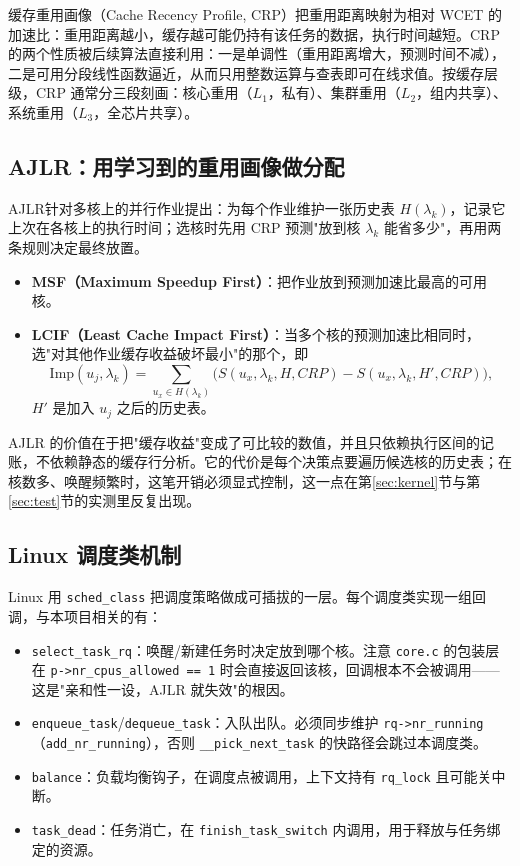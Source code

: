 缓存重用画像（Cache Recency Profile, CRP）把重用距离映射为相对 WCET 的加速比：重用距离越小，缓存越可能仍持有该任务的数据，执行时间越短。CRP 的两个性质被后续算法直接利用：一是单调性（重用距离增大，预测时间不减），二是可用分段线性函数逼近，从而只用整数运算与查表即可在线求值。按缓存层级，CRP 通常分三段刻画：核心重用（$L_1$，私有）、集群重用（$L_2$，组内共享）、系统重用（$L_3$，全芯片共享）。

\subsection{AJLR：用学习到的重用画像做分配}

AJLR\cite{ref7}针对多核上的并行作业提出：为每个作业维护一张历史表 $H(\lambda_k)$，记录它上次在各核上的执行时间；选核时先用 CRP 预测"放到核 $\lambda_k$ 能省多少"，再用两条规则决定最终放置。

\begin{itemize}
    \item \textbf{MSF（Maximum Speedup First）}：把作业放到预测加速比最高的可用核。
    \item \textbf{LCIF（Least Cache Impact First）}：当多个核的预测加速比相同时，选"对其他作业缓存收益破坏最小"的那个，即
    \begin{equation}
    \mathrm{Imp}(u_j,\lambda_k)=\sum_{u_x\in H(\lambda_k)}\Big(S(u_x,\lambda_k,H,CRP)-S(u_x,\lambda_k,H',CRP)\Big),
    \end{equation}
    $H'$ 是加入 $u_j$ 之后的历史表。
\end{itemize}

AJLR 的价值在于把"缓存收益"变成了可比较的数值，并且只依赖执行区间的记账，不依赖静态的缓存行分析。它的代价是每个决策点要遍历候选核的历史表；在核数多、唤醒频繁时，这笔开销必须显式控制，这一点在第\ref{sec:kernel}节与第\ref{sec:test}节的实测里反复出现。

\subsection{Linux 调度类机制}

Linux 用 \texttt{sched\_class} 把调度策略做成可插拔的一层\cite{ref9}。每个调度类实现一组回调，与本项目相关的有：

\begin{itemize}
    \item \texttt{select\_task\_rq}：唤醒/新建任务时决定放到哪个核。注意 \texttt{core.c} 的包装层在 \texttt{p->nr\_cpus\_allowed == 1} 时会直接返回该核，回调根本不会被调用——这是"亲和性一设，AJLR 就失效"的根因。
    \item \texttt{enqueue\_task}/\texttt{dequeue\_task}：入队出队。必须同步维护 \texttt{rq->nr\_running}（\texttt{add\_nr\_running}），否则 \texttt{\_\_pick\_next\_task} 的快路径会跳过本调度类。
    \item \texttt{balance}：负载均衡钩子，在调度点被调用，上下文持有 \texttt{rq\_lock} 且可能关中断。
    \item \texttt{task\_dead}：任务消亡，在 \texttt{finish\_task\_switch} 内调用，用于释放与任务绑定的资源。
\end{itemize}


